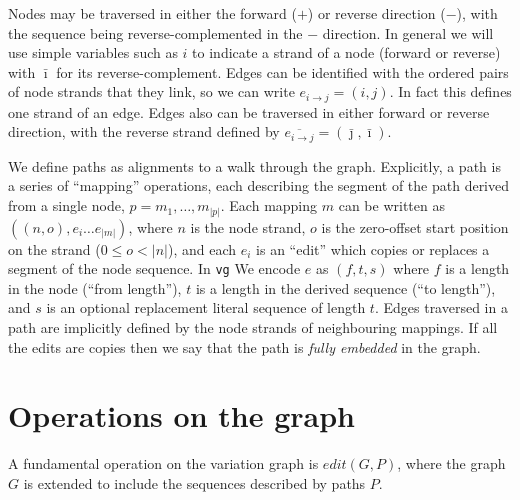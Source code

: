 \documentclass{article}
\begin{document}
Nodes may be traversed in either the forward ($+$) or reverse direction ($-$), with the sequence being reverse-complemented in the
$-$ direction.  In general we will use simple variables such as $i$ to indicate a strand of a node (forward or reverse) with $\bar \imath$
for its reverse-complement.  Edges can be identified with the ordered pairs of node strands that they link, so we can write
$e_{i \rightarrow j} = ( i, j ) $.  In fact this defines one strand of an edge.  Edges also can be traversed in either forward or
reverse direction, with the reverse strand defined by $\overline{e_{i \rightarrow j}} = (  {\bar \jmath}, {\bar \imath} )$.

We define paths as alignments to a walk through the graph.  Explicitly, a path is a series of ``mapping'' operations, each
describing the segment of the path derived from a single node, $p = m_1, \ldots, m_{|p|}$.  Each mapping $m$ can be written
as $( (n, o), e_i \ldots e_{|m|} )$, where $n$ is the node strand, $o$ is the zero-offset start position on the strand ($0 \le o < |n|$),
and each $e_i$ is an ``edit'' which copies or replaces a segment of the node sequence.  In {\tt vg} We encode $e$ as $(f, t, s)$
where $f$ is a length in the node (``from length''), $t$ is a length in the derived sequence (``to length''), and $s$ is an optional
replacement literal sequence of length $t$.  Edges traversed in a path are implicitly defined by the node strands of neighbouring mappings.
If all the edits are copies then we say that the path is {\em fully embedded} in the graph.

\section{Operations on the graph}

A fundamental operation on the variation graph is $edit(G, P)$, where the graph $G$ is extended to include the sequences described by paths $P$.
\end{document}
